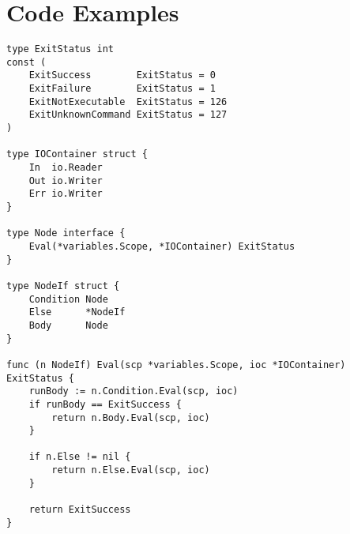 \chapter{Code Examples}

\begin{lstlisting}[label=code:node-interface,caption={}]
type ExitStatus int
const (
	ExitSuccess        ExitStatus = 0
	ExitFailure        ExitStatus = 1
	ExitNotExecutable  ExitStatus = 126
	ExitUnknownCommand ExitStatus = 127
)

type IOContainer struct {
	In  io.Reader
	Out io.Writer
	Err io.Writer
}

type Node interface {
	Eval(*variables.Scope, *IOContainer) ExitStatus
}

type NodeIf struct {
	Condition Node
	Else      *NodeIf
	Body      Node
}

func (n NodeIf) Eval(scp *variables.Scope, ioc *IOContainer) ExitStatus {
	runBody := n.Condition.Eval(scp, ioc)
	if runBody == ExitSuccess {
		return n.Body.Eval(scp, ioc)
	}

	if n.Else != nil {
		return n.Else.Eval(scp, ioc)
	}

	return ExitSuccess
}     


\end{lstlisting}
